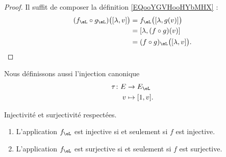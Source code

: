\begin{proof}
	Il suffit de composer la définition \eqref{EQooYGVHooHYbMHX} :
	\begin{subequations}
		\begin{align}
			(f_{\eL}\circ g_{\eL})\big( [\lambda,v] \big) & =f_{\eL}\big( [\lambda,g(v)] \big)        \\
			                                              & =[\lambda,(f\circ g)(v)]                  \\
			                                              & =(f\circ g)_{\eL}\big( [\lambda,v] \big).
		\end{align}
	\end{subequations}
\end{proof}

Nous définissons aussi l'injection canonique
\begin{equation}
	\begin{aligned}
		\tau \colon E & \to E_{\eL}    \\
		v             & \mapsto [1,v].
	\end{aligned}
\end{equation}

\begin{proposition}      \label{PropooWECLooHPzIHw}
	Injectivité et surjectivité respectées.
	\begin{enumerate}
		\item
		      L'application \( f_{\eL}\) est injective si et seulement si \( f\) est injective.
		\item
		      L'application \( f_{\eL}\) est surjective si et seulement si \( f\) est surjective.
	\end{enumerate}
\end{proposition}

